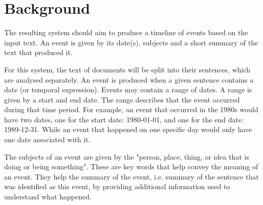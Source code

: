 \chapter{Background}
\par The resulting system should aim to produce a timeline of events based on the input text. An event is given by its date(s), subjects and a short summary of the text that produced it. 
\par For this system, the text of documents will be split into their sentences, which are analysed separately. An event is produced when a given sentence contains a date (or temporal expression). Events may contain a range of dates. A range is given by a start and end date. The range describes that the event occurred during that time period. For example, an event that occurred in the 1980s would have two dates, one for the start date: 1980-01-01, and one for the end date: 1989-12-31. While an event that happened on one specific day would only have one date associated with it. 
\par The subjects of an event are given by the "person, place, thing, or idea that is doing or being something"\cite{grammar}. These are key words that help convey the meaning of an event. They help the summary of the event, i.e. summary of the sentence that was identified as this event, by providing additional information used to understand what happened.

